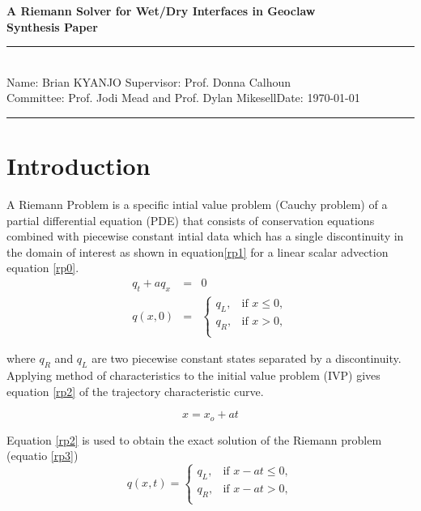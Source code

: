 \documentclass[12pt,a4paper]{article}
\newcommand{\student}{Brian KYANJO }
\newcommand{\course}{Prof. Jodi Mead and Prof. Dylan Mikesell}
\newcommand{\assignment}{ Prof. Donna Calhoun}
\begin{document}
	
	\thispagestyle{empty}
	\begin{center}
		\textbf{A Riemann Solver for Wet/Dry Interfaces in Geoclaw \\[0.5cm]
		Synthesis Paper}
		\vspace{.2cm}
	\end{center}
	
	\noindent
	\rule{17cm}{0.2cm}\\[0.3cm]
	Name: \student \hfill Supervisor: \assignment\\[0.1cm]
	Committee: \course \hfill Date: \today\\
	\rule{17cm}{0.05cm}
	\vspace{.2cm}
	
	\section{Introduction}
	 A Riemann Problem is a specific intial value problem  (Cauchy problem) of a partial differential equation (PDE) that consists of conservation equations combined with piecewise constant intial data which has a single discontinuity in the domain of interest as shown in equation\eqref{rp1} for a  linear scalar advection equation \eqref{rp0}. 
	 \begin{eqnarray}
	 	q_{t} + a q_{x}& =& 0
	 	\label{rp0}\\
	 	q(x,0)& =& \begin{cases}
	 		q_{L}, & \text{if $x \le 0,$}\\
	 		q_{R},& \text{if $x > 0,$}\\
	 		
	 	\end{cases}  
	 	\label{rp1}     
	 \end{eqnarray}
	 
	
	 \noindent where $q_{R}$ and $q_{L}$ are two piecewise constant states separated by a discontinuity. Applying method of characteristics to the initial value problem (IVP) gives  equation \eqref{rp2} of the trajectory characteristic curve.
	 
	 \begin{equation}
	 x = x_{o} + at 
	 \label{rp2}
	 \end{equation}
	
	 
	 \noindent Equation \eqref{rp2} is used to obtain the exact solution of the Riemann problem (equatio \eqref{rp3})
	 \begin{equation}
	 	q(x,t)  = \begin{cases}
	 		q_{L}, & \text{if $x - at \le 0,$}\\
	 		q_{R},& \text{if $x - at > 0,$}\\
	 		
	 	\end{cases}    
 	\label{rp3}   
	 \end{equation}
 
\end{document}
